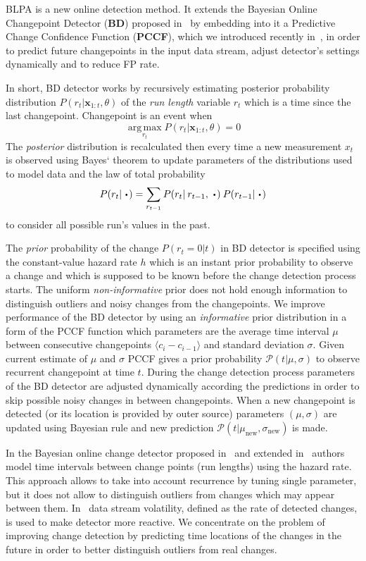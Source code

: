 BLPA is a new online detection method. It extends the Bayesian Online Changepoint Detector (\textbf{BD}) proposed in~\cite{mackay2007} by embedding into it a Predictive Change Confidence Function (\textbf{PCCF}), which we introduced recently in~\cite{MaslovSDM2016}, in order to predict future changepoints in the input data stream, adjust detector's settings dynamically and to reduce FP rate.

In short, BD detector works by recursively estimating posterior probability distribution $P(r_t | \pmb{x}_{1:t}, \theta)$ of the \textit{run length}  variable $r_t$ which is a time since the last changepoint.
Changepoint is an event when
\[
    \operatorname*{arg\,max}_{r_t} P(r_t | \pmb{x}_{1:t}, \theta) = 0
\]
The \textit{posterior} distribution is recalculated then every time a new measurement $x_t$ is observed using Bayes` theorem to update parameters of the distributions used to model data
and the law of total probability
\[
P(r_t|\:\LargeCdot) = \sum_{r_{t-1}} P(r_{t} | \: r_{t-1},\:\LargeCdot) \: P(r_{t-1}|\:\LargeCdot)
\]
to consider all possible run's values in the past.

The \textit{prior} probability of the change $P(r_t=0|t)$ in BD detector is specified using the constant-value hazard rate $h$ which is an instant prior probability to observe a change and which is supposed to be known before the change detection process starts.
The uniform \textit{non-informative} prior does not hold enough information to distinguish outliers and noisy changes from the changepoints.
We improve performance of the BD detector by using an \textit{informative} prior distribution in a form of the PCCF function which parameters are the average time interval $\mu$ between consecutive changepoints $\langle c_i - c_{i-1} \rangle$ and standard deviation $\sigma$.
Given current estimate of $\mu$ and $\sigma$ PCCF gives a prior probability $\mathcal{P}(t | \mu,\sigma)$ to observe recurrent changepoint at time $t$.
During the change detection process parameters of the BD detector are adjusted dynamically according the predictions in order to skip possible noisy changes in between changepoints.
When a new changepoint is detected  (or its location is provided by outer source) parameters $(\mu, \sigma)$ are updated using Bayesian rule and new prediction
$\mathcal{P}(t | \mu_{\text{new}}, \sigma_{\text{new}})$ is made.

In the Bayesian online change detector proposed in~\cite{mackay2007} and extended in~\cite{Wilson2010a} authors model time intervals between change points (run lengths) using the hazard rate.
This approach allows to take into account recurrence by tuning single parameter, but it does not allow to distinguish outliers from changes which may appear between them.
In~\cite{huang2014detecting} data stream volatility, defined as the rate of detected changes, is used to make detector more reactive.
We concentrate on the problem of improving change detection by predicting time locations of the changes in the future in order to better distinguish outliers from real changes.

